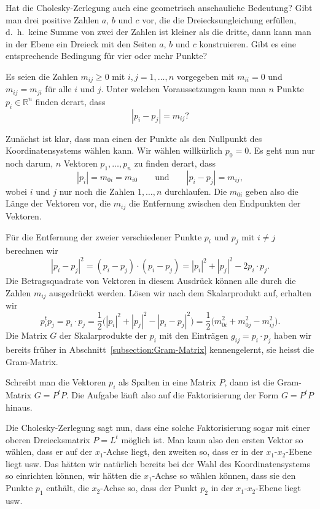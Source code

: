 Hat die Cholesky-Zerlegung auch eine geometrisch anschauliche
Bedeutung?
Gibt man drei positive Zahlen $a$, $b$ und $c$ vor, die die
Dreiecksungleichung erfüllen, d.~h.~keine Summe von zwei der Zahlen
ist kleiner als die dritte, dann kann man in der Ebene ein Dreieck
mit den Seiten $a$, $b$ und $c$ konstruieren.
Gibt es eine entsprechende Bedingung für vier oder mehr Punkte?

\begin{aufgabe}
Es seien
die Zahlen $m_{ij}\ge 0$ mit $i,j=1,\dots,n$ vorgegeben
mit $m_{ii}=0$ und $m_{ij}=m_{ji}$ für alle $i$ und $j$.
Unter welchen Voraussetzungen 
kann man $n$ Punkte $p_i\in\mathbb{R}^n$ finden derart, dass
\[
|p_i-p_j| = m_{ij}?
\]
\end{aufgabe}

Zunächst ist klar, dass man einen der Punkte als den Nullpunkt des
Koordinatensystems wählen kann.
Wir wählen willkürlich $p_0=0$.
Es geht nun nur noch darum, $n$ Vektoren $p_1,\dots,p_n$ zu finden derart,
dass
\[
|p_i| = m_{0i} = m_{i0}
\qquad\text{und}\qquad
|p_i-p_j| = m_{ij},
\]
wobei $i$ und $j$ nur noch die Zahlen $1,\dots,n$ durchlaufen.
Die $m_{0i}$ geben also die Länge der Vektoren vor,
die $m_{ij}$ die Entfernung zwischen den Endpunkten der Vektoren.

Für die Entfernung der zweier verschiedener Punkte $p_i$ und $p_j$
mit $i\ne j$ berechnen wir
\[
|p_i-p_j|^2
=
(p_i-p_j)\cdot(p_i-p_j)
=
|p_i|^2 + |p_j|^2 -2 p_i\cdot p_j.
\]
Die Betragsquadrate von Vektoren in diesem Ausdrück können alle durch
die Zahlen $m_{ij}$ ausgedrückt werden.
Lösen wir nach dem Skalarprodukt auf, erhalten wir
\[
p_i^t p_j
=
p_i\cdot p_j
=
\frac12\bigl(
|p_i|^2
+
|p_j|^2
-
|p_i-p_j|^2
\bigr)
=
\frac12\bigl(
m_{0i}^2 + m_{0j}^2 - m_{ij}^2
\bigr).
\]
Die Matrix $G$ der Skalarprodukte der $p_i$ mit den Einträgen
$g_{ij} = p_i\cdot p_j$ haben wir bereits früher in
Abschnitt~\ref{subsection:Gram-Matrix} kennengelernt,
sie heisst die Gram-Matrix.

Schreibt man die Vektoren $p_i$ als Spalten in eine Matrix $P$,
dann ist die Gram-Matrix $G=P^tP$.
Die Aufgabe läuft also auf die Faktorisierung der Form $G=P^tP$ 
hinaus.

Die Cholesky-Zerlegung sagt nun, dass eine solche Faktorisierung
sogar mit einer oberen Dreiecksmatrix $P=L^t$ möglich ist.
Man kann also den ersten Vektor so wählen, dass er auf der
$x_1$-Achse liegt, den zweiten so, dass er in der $x_1$-$x_2$-Ebene
liegt usw.
Das hätten wir natürlich bereits bei der Wahl des Koordinatensystems
so einrichten können, wir hätten die $x_1$-Achse so wählen können,
dass sie den Punkte $p_1$ enthält, die $x_2$-Achse so, dass der Punkt
$p_2$ in der $x_1$-$x_2$-Ebene liegt usw.

